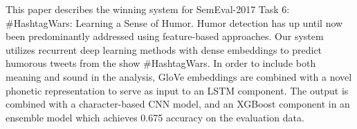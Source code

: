 This paper describes the winning system for SemEval-2017 Task 6: \#HashtagWars: Learning a Sense of Humor. Humor detection has up until now been predominantly addressed using feature-based approaches. Our system utilizes recurrent deep learning methods with dense embeddings to predict humorous tweets from the \@midnight show \#HashtagWars. In order to include both meaning and sound in the analysis, GloVe embeddings are combined with a novel phonetic representation to serve as input to an LSTM component. The output is combined with a character-based CNN model, and an XGBoost component in an ensemble model which achieves 0.675 accuracy on the evaluation data.
